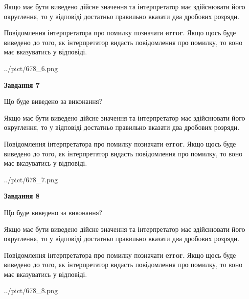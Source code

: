 \documentclass[12pt, ukrainian]{article}
\begin{document}
{\begin {Large}
Якщо має бути виведено дійсне значення та інтерпретатор має здійснювати його округлення, 
то у відповіді достатньо правильно вказати два дробових розряди.

Повідомлення інтерпретатора про помилку позначати \textbf{error}.
Якщо щось буде виведено до того, як інтерпретатор видасть повідомлення про помилку, 
то воно має вказуватись у відповіді. \par

\begin{center}
	{../pict/678_6.png}
\end{center}
\newpage

{\begin {center}\textbf{Завдання 7}\end {center}}\par
Що буде виведено за виконання? \par

Якщо має бути виведено дійсне значення та інтерпретатор має здійснювати його округлення, 
то у відповіді достатньо правильно вказати два дробових розряди.

Повідомлення інтерпретатора про помилку позначати \textbf{error}.
Якщо щось буде виведено до того, як інтерпретатор видасть повідомлення про помилку, 
то воно має вказуватись у відповіді. \par

\begin{center}
	{../pict/678_7.png}
\end{center}
\newpage

{\begin {center}\textbf{Завдання 8}\end {center}}\par
Що буде виведено за виконання? \par

Якщо має бути виведено дійсне значення та інтерпретатор має здійснювати його округлення, 
то у відповіді достатньо правильно вказати два дробових розряди.

Повідомлення інтерпретатора про помилку позначати \textbf{error}.
Якщо щось буде виведено до того, як інтерпретатор видасть повідомлення про помилку, 
то воно має вказуватись у відповіді. \par

\begin{center}
	{../pict/678_8.png}
\end{center}
\newpage


\end{Large}}
\end{document}
